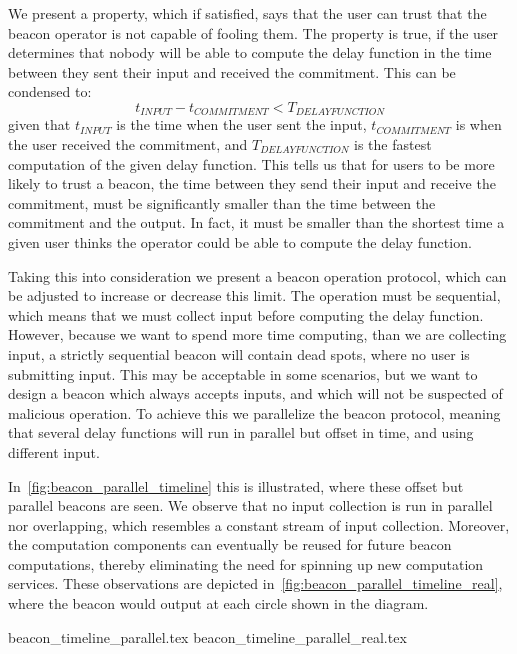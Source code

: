 We present a property, which if satisfied, says that the user can trust that the beacon operator is not capable of fooling them.
The property is true, if the user determines that nobody will be able to compute the delay function in the time between they sent their input and received the commitment.
This can be condensed to:
\begin{equation}
    t_{INPUT} - t_{COMMITMENT} < T_{DELAY FUNCTION}
\end{equation}
given that $t_{INPUT}$ is the time when the user sent the input, $t_{COMMITMENT}$ is when the user received the commitment, and $T_{DELAY FUNCTION}$ is the fastest computation of the given delay function.
This tells us that for users to be more likely to trust a beacon, the time between they send their input and receive the commitment, must be significantly smaller than the time between the commitment and the output.
In fact, it must be smaller than the shortest time a given user thinks the operator could be able to compute the delay function.

Taking this into consideration we present a beacon operation protocol, which can be adjusted to increase or decrease this limit.
The operation must be sequential, which means that we must collect input before computing the delay function.
However, because we want to spend more time computing, than we are collecting input, a strictly sequential beacon will contain dead spots, where no user is submitting input.
This may be acceptable in some scenarios, but we want to design a beacon which always accepts inputs, and which will not be suspected of malicious operation.
To achieve this we parallelize the beacon protocol, meaning that several delay functions will run in parallel but offset in time, and using different input.

In~\cref{fig:beacon_parallel_timeline} this is illustrated, where these offset but parallel beacons are seen.
We observe that no input collection is run in parallel nor overlapping, which resembles a constant stream of input collection.
Moreover, the computation components can eventually be reused for future beacon computations, thereby eliminating the need for spinning up new computation services.
These observations are depicted in~\cref{fig:beacon_parallel_timeline_real}, where the beacon would output at each circle shown in the diagram.

{beacon_timeline_parallel.tex}
{beacon_timeline_parallel_real.tex}
